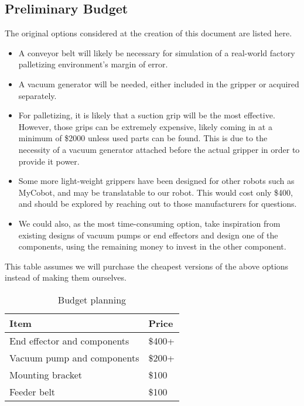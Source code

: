 \subsection{Preliminary Budget}
 The original options considered at the creation of this document are listed here.

\begin{itemize}
    \item A conveyor belt will likely be necessary for simulation of a real-world factory palletizing environment's margin of error.
    \item A vacuum generator will be needed, either included in the gripper or acquired separately.
    \item For palletizing, it is likely that a suction grip will be the most effective. However, those grips can be extremely expensive, likely coming in at a minimum of \$2000 unless used parts can be found. This is due to the necessity of a vacuum generator attached before the actual gripper in order to provide it power.
    \item Some more light-weight grippers have been designed for other robots such as MyCobot, and may be translatable to our robot. This would cost only \$400, and should be explored by reaching out to those manufacturers for questions.
    \item We could also, as the most time-consuming option, take inspiration from existing designs of vacuum pumps or end effectors and design one of the components, using the remaining money to invest in the other component. 
\end{itemize}


This table assumes we will purchase the cheapest versions of the above options instead of making them ourselves.
\begin{table}[H]
\centering
    \caption{Budget planning}
    \begin{tabular}{|l|l|}
        \hline
        \textbf{Item} & \textbf{Price} \\ \hline
        End effector and components & \$400+ \\ \hline
        Vacuum pump  and components & \$200+ \\ \hline
        Mounting bracket & \$100\\ \hline
        Feeder belt & \$100 \\ \hline
    \end{tabular}
\end{table}
